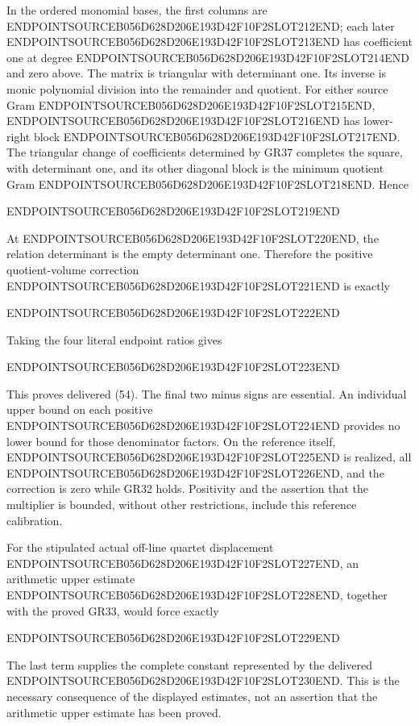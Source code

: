 In the ordered monomial bases, the first columns are ENDPOINTSOURCEB056D628D206E193D42F10F2SLOT212END; each later ENDPOINTSOURCEB056D628D206E193D42F10F2SLOT213END has coefficient one at degree ENDPOINTSOURCEB056D628D206E193D42F10F2SLOT214END and zero above. The matrix is triangular with determinant one. Its inverse is monic polynomial division into the remainder and quotient. For either source Gram ENDPOINTSOURCEB056D628D206E193D42F10F2SLOT215END, ENDPOINTSOURCEB056D628D206E193D42F10F2SLOT216END has lower-right block ENDPOINTSOURCEB056D628D206E193D42F10F2SLOT217END. The triangular change of coefficients determined by GR37 completes the square, with determinant one, and its other diagonal block is the minimum quotient Gram ENDPOINTSOURCEB056D628D206E193D42F10F2SLOT218END. Hence

ENDPOINTSOURCEB056D628D206E193D42F10F2SLOT219END

At ENDPOINTSOURCEB056D628D206E193D42F10F2SLOT220END, the relation determinant is the empty determinant one. Therefore the positive quotient-volume correction ENDPOINTSOURCEB056D628D206E193D42F10F2SLOT221END is exactly

ENDPOINTSOURCEB056D628D206E193D42F10F2SLOT222END

Taking the four literal endpoint ratios gives

ENDPOINTSOURCEB056D628D206E193D42F10F2SLOT223END

This proves delivered (54). The final two minus signs are essential. An individual upper bound on each positive ENDPOINTSOURCEB056D628D206E193D42F10F2SLOT224END provides no lower bound for those denominator factors. On the reference itself, ENDPOINTSOURCEB056D628D206E193D42F10F2SLOT225END is realized, all ENDPOINTSOURCEB056D628D206E193D42F10F2SLOT226END, and the correction is zero while GR32 holds. Positivity and the assertion that the multiplier is bounded, without other restrictions, include this reference calibration.

For the stipulated actual off-line quartet displacement ENDPOINTSOURCEB056D628D206E193D42F10F2SLOT227END, an arithmetic upper estimate ENDPOINTSOURCEB056D628D206E193D42F10F2SLOT228END, together with the proved GR33, would force exactly

ENDPOINTSOURCEB056D628D206E193D42F10F2SLOT229END

The last term supplies the complete constant represented by the delivered ENDPOINTSOURCEB056D628D206E193D42F10F2SLOT230END. This is the necessary consequence of the displayed estimates, not an assertion that the arithmetic upper estimate has been proved.

